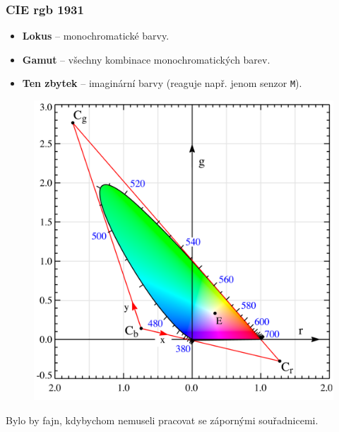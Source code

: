 \documentclass{beamer}
\begin{document}
\begin{frame}
  \center
  \frametitle{CIE rgb 1931}
  \begin{itemize}
    \item \textbf{Lokus} -- monochromatické barvy.
    \item \textbf{Gamut} -- všechny kombinace monochromatických barev.
    \item \textbf{Ten zbytek} -- imaginární barvy (reaguje např. jenom senzor \texttt{M}).
  \end{itemize}
  \begin{figure}
    \includegraphics[height=0.6\textheight]{CIE1931_rgxy.png}
  \end{figure}
  Bylo by fajn, kdybychom nemuseli pracovat se zápornými souřadnicemi.
\end{frame}
\end{document}
